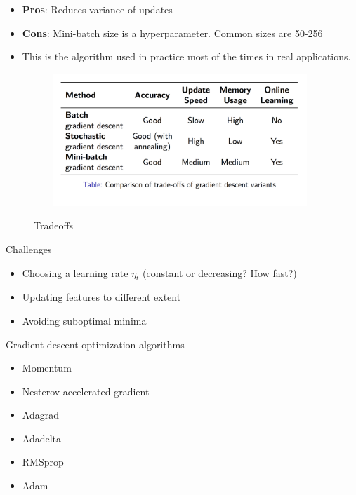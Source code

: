 \documentclass[english]{article}
\begin{document}
\begin{itemize}
\item \textbf{Pros}: Reduces variance of updates
\item \textbf{Cons}: Mini-batch size is a hyperparameter. Common sizes are 50-256

\item This is the algorithm used in practice most of the times in real applications.
\end{itemize}







\begin{figure}
\begin{center}
\caption{Tradeoffs}
\includegraphics[width = 11cm, height = 5cm]{comparison_table_sgd.png}
    \label{Tradeoffs}
\end{center}
\end{figure}






\item {Challenges}
\begin{itemize}
\item Choosing a learning rate $\eta_t$ (constant or decreasing? How fast?)

\item Updating features to different extent

\item Avoiding suboptimal minima
\end{itemize}









\item {Gradient descent optimization algorithms}
\begin{itemize}
\item Momentum
\item Nesterov accelerated gradient
\item Adagrad
\item Adadelta
\item RMSprop
\item Adam
\end{itemize}
\end{document}

